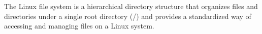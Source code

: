 The Linux file system is a hierarchical directory structure that organizes files and directories under a single root directory (/) and provides a standardized way of accessing and managing files on a Linux system.
